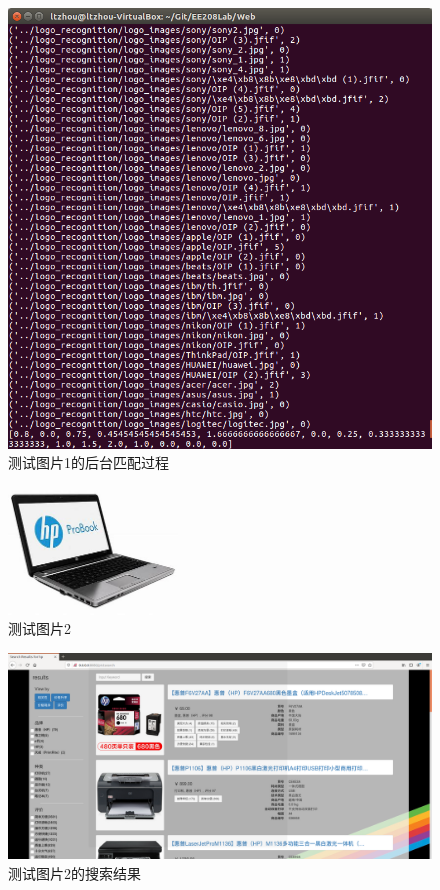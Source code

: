\begin{figure}[htbp]
\centering
\includegraphics[width=14.5cm]{img/zlt/pictmatch1_2.png}
\caption{测试图片1的后台匹配过程}
\label{fig:zlt_pictmatch1_2}
\end{figure}

\begin{figure}[htbp]
\centering
\includegraphics[width=4.5cm]{img/zlt/test2.jpeg}
\caption{测试图片2}
\label{fig:zlt_test2}
\end{figure}

\begin{figure}[htbp]
\centering
\includegraphics[width=14.5cm]{img/zlt/pictmatch2_1.png}
\caption{测试图片2的搜索结果}
\label{fig:zlt_pictmatch1}
\end{figure}

